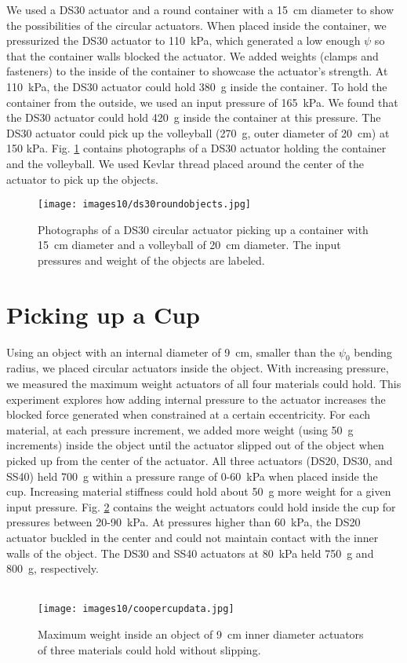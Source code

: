 We used a DS30 actuator and a round container with a 15~cm diameter to show the possibilities of the circular actuators. When placed inside the container, we pressurized the DS30 actuator to 110~kPa, which generated a low enough $\psi$ so that the container walls blocked the actuator. We added weights (clamps and fasteners) to the inside of the container to showcase the actuator's strength. At 110~kPa, the DS30 actuator could hold 380~g inside the container. To hold the container from the outside, we used an input pressure of 165~kPa. We found that the DS30 actuator could hold 420~g inside the container at this pressure. The DS30 actuator could pick up the volleyball (270~g, outer diameter of 20~cm) at 150 kPa. Fig. \ref{fig:ds30roundobjects} contains photographs of a DS30 actuator holding the container and the volleyball. We used Kevlar thread placed around the center of the actuator to pick up the objects. 
\\
\begin{figure}[!ht]
    \centering
     \texttt{[image: images10/ds30roundobjects.jpg]}
    \caption{Photographs of a DS30 circular actuator picking up a container with 15~cm diameter and a volleyball of 20~cm diameter. The input pressures and weight of the objects are labeled.}
    \label{fig:ds30roundobjects}
\end{figure}


\section{Picking up a Cup}

Using an object with an internal diameter of 9~cm, smaller than the $\psi_0$ bending radius, we placed circular actuators inside the object. With increasing pressure, we measured the maximum weight actuators of all four materials could hold. This experiment explores how adding internal pressure to the actuator increases the blocked force generated when constrained at a certain eccentricity. For each material, at each pressure increment, we added more weight (using 50~g increments) inside the object until the actuator slipped out of the object when picked up from the center of the actuator. All three actuators (DS20, DS30, and SS40) held 700~g within a pressure range of 0-60~kPa when placed inside the cup. Increasing material stiffness could hold about 50~g more weight for a given input pressure. Fig. \ref{fig:coopercupdata} contains the weight actuators could hold inside the cup for pressures between 20-90~kPa. At pressures higher than 60~kPa, the DS20 actuator buckled in the center and could not maintain contact with the inner walls of the object. The DS30 and SS40 actuators at 80~kPa held 750~g and 800~g, respectively. 
\\
\\
\begin{figure}[!ht]
    \centering
     \texttt{[image: images10/coopercupdata.jpg]}
    \caption{Maximum weight inside an object of 9~cm inner diameter actuators of three materials could hold without slipping.}
    \label{fig:coopercupdata}
\end{figure}


